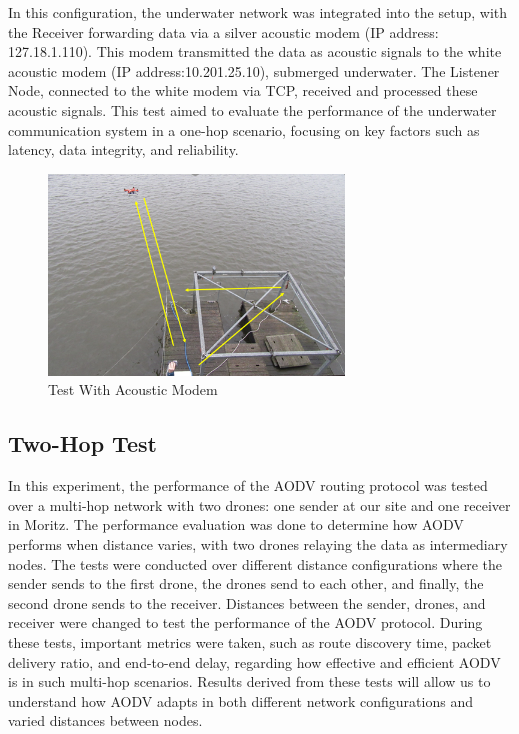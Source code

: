 \documentclass[]{nsm-thesis}
\begin{document}
In this configuration, the underwater network was integrated into the setup, with the Receiver  forwarding data via  a  silver  acoustic  modem (IP address: 127.18.1.110).
This modem transmitted the data as acoustic signals to the white acoustic modem (IP address:10.201.25.10), submerged underwater. The Listener Node, connected to the white modem via TCP, received and processed these acoustic signals. This test aimed to evaluate the performance of the underwater communication system in a one-hop scenario, focusing on key factors such as latency, data integrity, and reliability.
\begin{figure}[h!]
    \centering
    \includegraphics[width=0.7\textwidth]{image/test_with_acoustic.png}
    \caption{Test With Acoustic Modem}
    \label{fig:example8}
\end{figure}

\subsection{Two-Hop Test}
In this experiment, the performance of the AODV routing protocol was tested over a multi-hop network with two drones: one sender at our site and one receiver in Moritz. The performance evaluation was done to determine how AODV performs when distance varies, with two drones relaying the data as intermediary nodes. The tests were conducted over different distance configurations where the sender sends to the first drone, the drones send to each other, and finally, the second drone sends to the receiver. Distances between the sender, drones, and receiver were changed to test the performance of the AODV protocol. During these tests, important metrics were taken, such as route discovery time, packet delivery ratio, and end-to-end delay, regarding how effective and efficient AODV is in such multi-hop scenarios. Results derived from these tests will allow us to understand how AODV adapts in both different network configurations and varied distances between nodes.
\end{document}
